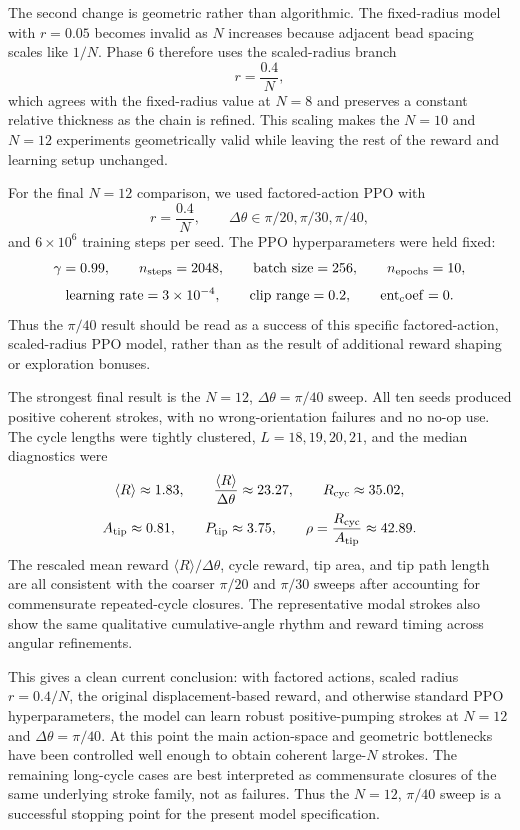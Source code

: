 \documentclass[11pt]{article}
\begin{document}
The second change is geometric rather than algorithmic.  The fixed-radius model with $r=0.05$ becomes invalid as $N$ increases because adjacent bead spacing scales like $1/N$.  Phase 6 therefore uses the scaled-radius branch
\[
r=\frac{0.4}{N},
\]
which agrees with the fixed-radius value at $N=8$ and preserves a constant relative thickness as the chain is refined.  This scaling makes the $N=10$ and $N=12$ experiments geometrically valid while leaving the rest of the reward and learning setup unchanged.

For the final $N=12$ comparison, we used factored-action PPO with
\[
r=\frac{0.4}{N}, \qquad
\Delta\theta \in {\pi/20,\pi/30,\pi/40},
\]
and $6\times 10^6$ training steps per seed.  The PPO hyperparameters were held fixed:
\[
\gamma=0.99,\qquad
n_{\rm steps}=2048,\qquad
{\rm batch\ size}=256,\qquad
n_{\rm epochs}=10,
\]
\[
{\rm learning\ rate}=3\times 10^{-4},\qquad
{\rm clip\ range}=0.2,\qquad
{\rm ent_coef}=0.
\]
Thus the $\pi/40$ result should be read as a success of this specific factored-action, scaled-radius PPO model, rather than as the result of additional reward shaping or exploration bonuses.

The strongest final result is the $N=12$, $\Delta\theta=\pi/40$ sweep.  All ten seeds produced positive coherent strokes, with no wrong-orientation failures and no no-op use.  The cycle lengths were tightly clustered, $L=18,19,20,21$, and the median diagnostics were
\[
\langle R\rangle \approx 1.83,\qquad
\frac{\langle R\rangle}{\Delta\theta} \approx 23.27,\qquad
R_{\rm cyc} \approx 35.02,
\]
\[
A_{\rm tip} \approx 0.81,\qquad
P_{\rm tip} \approx 3.75,\qquad
\rho=\frac{R_{\rm cyc}}{A_{\rm tip}} \approx 42.89.
\]
The rescaled mean reward $\langle R\rangle/\Delta\theta$, cycle reward, tip area, and tip path length are all consistent with the coarser $\pi/20$ and $\pi/30$ sweeps after accounting for commensurate repeated-cycle closures.  The representative modal strokes also show the same qualitative cumulative-angle rhythm and reward timing across angular refinements.

This gives a clean current conclusion: with factored actions, scaled radius $r=0.4/N$, the original displacement-based reward, and otherwise standard PPO hyperparameters, the model can learn robust positive-pumping strokes at $N=12$ and $\Delta\theta=\pi/40$.  At this point the main action-space and geometric bottlenecks have been controlled well enough to obtain coherent large-$N$ strokes.  The remaining long-cycle cases are best interpreted as commensurate closures of the same underlying stroke family, not as failures.  Thus the $N=12$, $\pi/40$ sweep is a successful stopping point for the present model specification.
\end{document}
